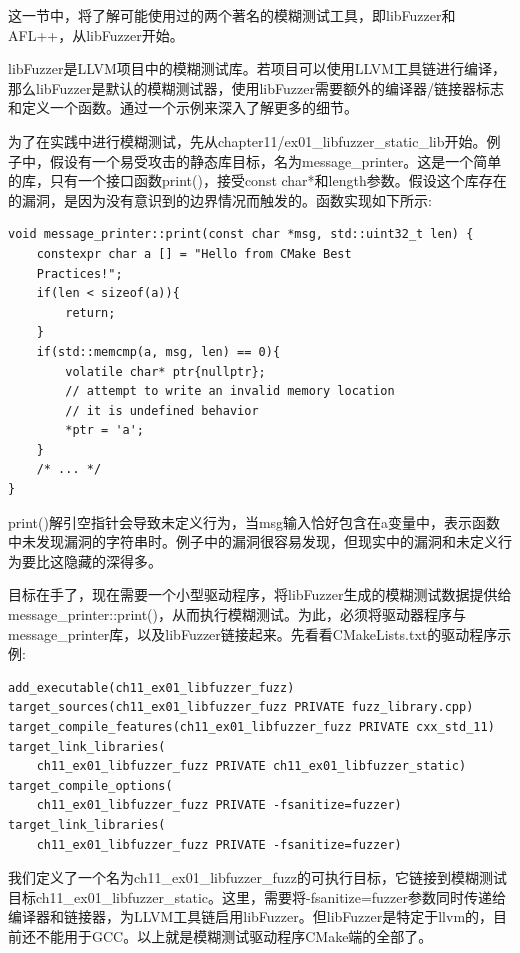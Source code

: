 
这一节中，将了解可能使用过的两个著名的模糊测试工具，即libFuzzer和AFL++，从libFuzzer开始。


libFuzzer是LLVM项目中的模糊测试库。若项目可以使用LLVM工具链进行编译，那么libFuzzer是默认的模糊测试器，使用libFuzzer需要额外的编译器/链接器标志和定义一个函数。通过一个示例来深入了解更多的细节。

为了在实践中进行模糊测试，先从chapter11/ex01\_libfuzzer\_static\_lib开始。例子中，假设有一个易受攻击的静态库目标，名为message\_printer。这是一个简单的库，只有一个接口函数print()，接受const char*和length参数。假设这个库存在的漏洞，是因为没有意识到的边界情况而触发的。函数实现如下所示:

\begin{lstlisting}[style=styleCXX]
void message_printer::print(const char *msg, std::uint32_t len) {
	constexpr char a [] = "Hello from CMake Best
	Practices!";
	if(len < sizeof(a)){
		return;
	}
	if(std::memcmp(a, msg, len) == 0){
		volatile char* ptr{nullptr};
		// attempt to write an invalid memory location
		// it is undefined behavior
		*ptr = 'a';
	}
	/* ... */
}
\end{lstlisting}

print()解引空指针会导致未定义行为，当msg输入恰好包含在a变量中，表示函数中未发现漏洞的字符串时。例子中的漏洞很容易发现，但现实中的漏洞和未定义行为要比这隐藏的深得多。

目标在手了，现在需要一个小型驱动程序，将libFuzzer生成的模糊测试数据提供给message\_printer::print()，从而执行模糊测试。为此，必须将驱动器程序与message\_printer库，以及libFuzzer链接起来。先看看CMakeLists.txt的驱动程序示例:

\begin{lstlisting}[style=styleCMake]
add_executable(ch11_ex01_libfuzzer_fuzz)
target_sources(ch11_ex01_libfuzzer_fuzz PRIVATE	fuzz_library.cpp)
target_compile_features(ch11_ex01_libfuzzer_fuzz PRIVATE cxx_std_11)
target_link_libraries(
	ch11_ex01_libfuzzer_fuzz PRIVATE ch11_ex01_libfuzzer_static)
target_compile_options(
	ch11_ex01_libfuzzer_fuzz PRIVATE -fsanitize=fuzzer)
target_link_libraries(
	ch11_ex01_libfuzzer_fuzz PRIVATE -fsanitize=fuzzer)
\end{lstlisting}

我们定义了一个名为ch11\_ex01\_libfuzzer\_fuzz的可执行目标，它链接到模糊测试目标ch11\_ex01\_libfuzzer\_static。这里，需要将-fsanitize=fuzzer参数同时传递给编译器和链接器，为LLVM工具链启用libFuzzer。但libFuzzer是特定于llvm的，目前还不能用于GCC。以上就是模糊测试驱动程序CMake端的全部了。

